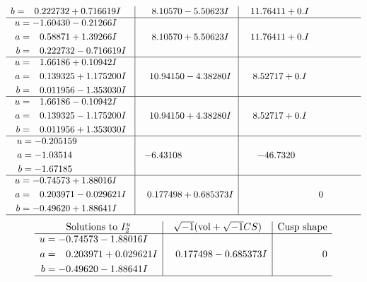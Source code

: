 \documentclass[1p]{elsarticle_modified}
\theoremstyle{definition}
\newcommand{\I}{\sqrt{-1}}
\begin{document}
$$\begin{array}{c|c|c}
\begin{aligned}
b &= \phantom{-}0.222732 + 0.716619 I\end{aligned}
 & \phantom{-}8.10570 - 5.50623 I & \phantom{-}11.76411 + 0. I\phantom{ +0.000000I} \\ \hline\begin{aligned}
u &= -1.60430 - 0.21266 I \\
a &= \phantom{-}0.58871 + 1.39266 I \\
b &= \phantom{-}0.222732 - 0.716619 I\end{aligned}
 & \phantom{-}8.10570 + 5.50623 I & \phantom{-}11.76411 + 0. I\phantom{ +0.000000I} \\ \hline\begin{aligned}
u &= \phantom{-}1.66186 + 0.10942 I \\
a &= \phantom{-}0.139325 + 1.175200 I \\
b &= \phantom{-}0.011956 - 1.353030 I\end{aligned}
 & \phantom{-}10.94150 - 4.38280 I & \phantom{-}8.52717 + 0. I\phantom{ +0.000000I} \\ \hline\begin{aligned}
u &= \phantom{-}1.66186 - 0.10942 I \\
a &= \phantom{-}0.139325 - 1.175200 I \\
b &= \phantom{-}0.011956 + 1.353030 I\end{aligned}
 & \phantom{-}10.94150 + 4.38280 I & \phantom{-}8.52717 + 0. I\phantom{ +0.000000I} \\ \hline\begin{aligned}
u &= -0.205159\phantom{ +0.000000I} \\
a &= -1.03514\phantom{ +0.000000I} \\
b &= -1.67185\phantom{ +0.000000I}\end{aligned}
 & -6.43108\phantom{ +0.000000I} & -46.7320\phantom{ +0.000000I} \\ \hline\begin{aligned}
u &= -0.74573 + 1.88016 I \\
a &= \phantom{-}0.203971 - 0.029621 I \\
b &= -0.49620 + 1.88641 I\end{aligned}
 & \phantom{-}0.177498 + 0.685373 I & \phantom{-0.000000 } 0\\
 \hline 
 \end{array}$$\newpage$$\begin{array}{c|c|c}  
\text{Solutions to }I^u_{2}& \I (\text{vol} + \sqrt{-1}CS) & \text{Cusp shape}\\
 \hline 
\begin{aligned}
u &= -0.74573 - 1.88016 I \\
a &= \phantom{-}0.203971 + 0.029621 I \\
b &= -0.49620 - 1.88641 I\end{aligned}
 & \phantom{-}0.177498 - 0.685373 I & \phantom{-0.000000 } 0\\
 \hline 
 \end{array}$$\newpage
\end{document}
